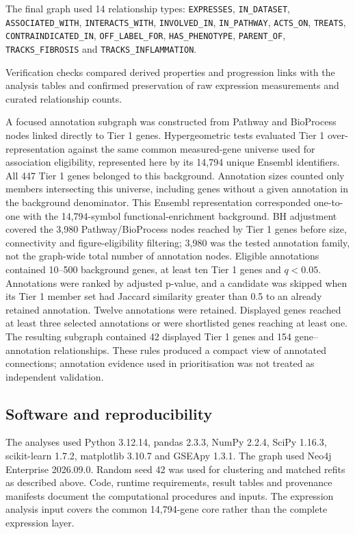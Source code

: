 \documentclass[11pt,a4paper]{article}
\begin{document}
\begingroup\raggedright
The final graph used 14 relationship types: \texttt{EXPRESSES}, \texttt{IN\_DATASET}, \texttt{ASSOCIATED\_WITH}, \texttt{INTERACTS\_WITH}, \texttt{INVOLVED\_IN}, \texttt{IN\_PATHWAY}, \texttt{ACTS\_ON}, \texttt{TREATS}, \texttt{CONTRAINDICATED\_IN}, \texttt{OFF\_LABEL\_FOR}, \texttt{HAS\_PHENOTYPE}, \texttt{PARENT\_OF}, \texttt{TRACKS\_FIBROSIS} and \texttt{TRACKS\_INFLAMMATION}.\par
\endgroup

 Verification checks compared derived properties and progression links with the analysis tables and confirmed preservation of raw expression measurements and curated relationship counts.

A focused annotation subgraph was constructed from Pathway and BioProcess nodes linked directly to Tier 1 genes. Hypergeometric tests evaluated Tier 1 over-representation against the same common measured-gene universe used for association eligibility, represented here by its 14,794 unique Ensembl identifiers. All 447 Tier 1 genes belonged to this background. Annotation sizes counted only members intersecting this universe, including genes without a given annotation in the background denominator. This Ensembl representation corresponded one-to-one with the 14,794-symbol functional-enrichment background. BH adjustment covered the 3,980 Pathway/BioProcess nodes reached by Tier 1 genes before size, connectivity and figure-eligibility filtering; 3,980 was the tested annotation family, not the graph-wide total number of annotation nodes. Eligible annotations contained 10--500 background genes, at least ten Tier 1 genes and \(q<0.05\). Annotations were ranked by adjusted p-value, and a candidate was skipped when its Tier 1 member set had Jaccard similarity greater than 0.5 to an already retained annotation. Twelve annotations were retained. Displayed genes reached at least three selected annotations or were shortlisted genes reaching at least one. The resulting subgraph contained 42 displayed Tier 1 genes and 154 gene--annotation relationships. These rules produced a compact view of annotated connections; annotation evidence used in prioritisation was not treated as independent validation.


\subsection*{Software and reproducibility}
The analyses used Python 3.12.14, pandas 2.3.3, NumPy 2.2.4, SciPy 1.16.3, scikit-learn 1.7.2, matplotlib 3.10.7 and GSEApy 1.3.1. The graph used Neo4j Enterprise 2026.09.0. Random seed 42 was used for clustering and matched refits as described above. Code, runtime requirements, result tables and provenance manifests document the computational procedures and inputs. The expression analysis input covers the common 14,794-gene core rather than the complete expression layer.
\end{document}
